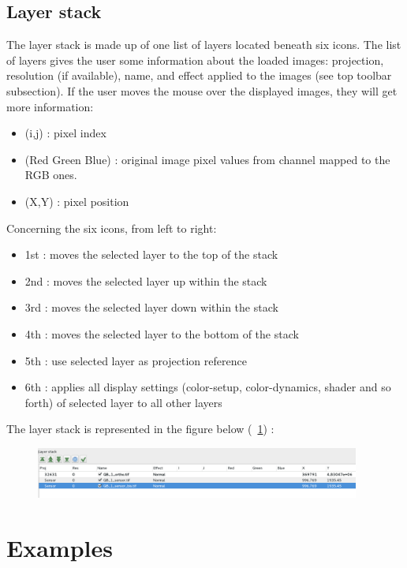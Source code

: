 \subsection{Layer stack}

The layer stack is made up of one list of layers located beneath six icons.
The list of layers gives the user some information about the loaded images:
projection, resolution (if available), name, and effect applied to the images (see top toolbar subsection).
If the user moves the mouse over the displayed images, they will get more information:

\begin{itemize}
\item (i,j) : pixel index
\item (Red Green Blue) : original image pixel values from channel mapped to the RGB ones.
\item (X,Y) : pixel position
\end{itemize}

Concerning the six icons, from left to right:
\begin{itemize}
\item 1st : moves the selected layer to the top of the stack
\item 2nd : moves the selected layer up within the stack
\item 3rd : moves the selected layer down within the stack
\item 4th : moves the selected layer to the bottom of the stack
\item 5th : use selected layer as projection reference
\item 6th : applies all display settings (color-setup, color-dynamics, shader and so forth) of selected layer to all other layers
\end{itemize}

The layer stack is represented in the figure below (~\ref{fig:layerstack}) :
\begin{figure}[!h] 
  \center
  \includegraphics[width=0.95\textwidth]{../Art/MonteverdiImages/layerstack.png}
  \label{fig:layerstack}
\end{figure}


\section{Examples}\label{sec:monexamples}

